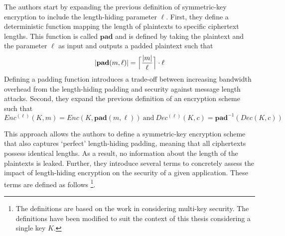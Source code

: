 The authors \cite{DBLP:conf/ctrsa/GellertJLN22} start by expanding the previous definition of symmetric-key encryption to include the length-hiding parameter $\ell$. First, they define a deterministic function mapping the length of plaintexts to specific ciphertext lengths. This function is called $\mathbf{pad}$ and is defined by taking the plaintext and the parameter $\ell$ as input and outputs a padded plaintext such that 
\begin{equation*}
|\mathbf{pad}(m,\ell)| = \Bigl\lceil \dfrac{|m|}{\ell} \Bigr\rceil \cdot \ell
\end{equation*}
Defining a padding function introduces a trade-off between increasing bandwidth overhead from the length-hiding padding and security against message length attacks. Second, they expand the previous definition of an encryption scheme such that
\begin{equation*}
Enc^{(\ell)}(K, m) = Enc(K, \mathbf{pad}(m,\ell)) \ \text{and} \ Dec^{(\ell)}(K, c) = \mathbf{pad}^{-1}(Dec(K, c))
\end{equation*}

This approach allows the authors to define a symmetric-key encryption scheme that also captures `perfect' length-hiding padding, meaning that all ciphertexts possess identical lengths. As a result, no information about the length of the plaintexts is leaked. Further, they introduce several terms to concretely assess the impact of length-hiding encryption on the security of a given application. These terms are defined as follows \footnote{The definitions are based on the work in \cite{DBLP:conf/ctrsa/GellertJLN22} considering multi-key security. The definitions have been modified to suit the context of this thesis considering a single key $K$.}.

